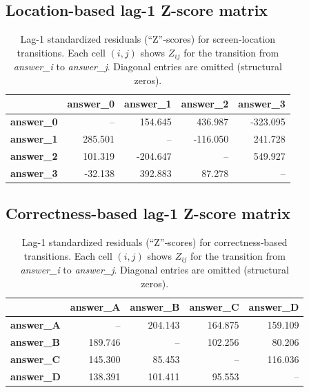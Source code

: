 \documentclass[manuscript,review,anonymous]{acmart}
\begin{document}
    \subsection{Location-based lag-1 Z-score matrix}
    \label{app:lsa_location}
    \begin{table}[H]
        \centering
        \begin{tabular}{lrrrr}
        \hline
                    & \textbf{answer\_0}  & \textbf{answer\_1}   & \textbf{answer\_2}   & \textbf{answer\_3}   \\ 
        \hline
        \textbf{answer\_0}  &   --        &   154.645   &   436.987   &  -323.095   \\
        \textbf{answer\_1}  &  285.501    &    --       &  -116.050   &   241.728   \\
        \textbf{answer\_2}  &  101.319    &  -204.647   &    --       &   549.927   \\
        \textbf{answer\_3}  &  -32.138    &   392.883   &    87.278   &    --       \\
        \hline
        \end{tabular}
        \caption{Lag-1 standardized residuals (“Z”‐scores) for screen‐location transitions. Each cell $(i,j)$ shows $Z_{ij}$ for the transition from \textit{answer\_i} to \textit{answer\_j}. Diagonal entries are omitted (structural zeros).}
        \label{tab:lsa_location}
    \end{table}


    \subsection{Correctness-based lag-1 Z-score matrix}
    \label{app:lsa_label}
    \begin{table}[H]
        \centering
        \begin{tabular}{lrrrr}
        \hline
                    & \textbf{answer\_A}   & \textbf{answer\_B}   & \textbf{answer\_C}   & \textbf{answer\_D}   \\ 
        \hline
        \textbf{answer\_A}  &   --       &   204.143   &   164.875   &   159.109   \\
        \textbf{answer\_B}  &  189.746   &    --       &   102.256   &    80.206   \\
        \textbf{answer\_C}  &  145.300   &    85.453   &    --       &   116.036   \\
        \textbf{answer\_D}  &  138.391   &   101.411   &    95.553   &    --       \\
        \hline
        \end{tabular}
        \caption{Lag-1 standardized residuals (“Z”‐scores) for correctness‐based transitions. Each cell $(i,j)$ shows $Z_{ij}$ for the transition from \textit{answer\_i} to \textit{answer\_j}. Diagonal entries are omitted (structural zeros).}
        \label{tab:lsa_label}
    \end{table}
\end{document}
